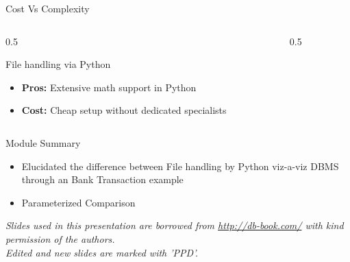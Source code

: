 \documentclass[aspectratio=169, xcolor=dvipsnames]{beamer}
\begin{document}
\begin{frame}{Cost Vs Complexity}
    \begin{columns}[t]
        \begin{column}{0.5\textwidth}
            \begin{alertblock}{File handling via Python}
                \begin{itemize}[<+->]
                    \item \textbf{Pros:} Extensive math support in Python
                    \item \textbf{Cost:} Cheap setup without dedicated specialists
                \end{itemize}
            \end{alertblock}
        \end{column}
        \begin{column}{0.5\textwidth}
        \end{column}
    \end{columns}
\end{frame}

\begin{frame}{Module Summary}
    \begin{itemize}
        \item Elucidated the difference between File handling by Python viz-a-viz DBMS through an Bank Transaction example
        \item Parameterized Comparison
    \end{itemize}
    
    \vspace{2em}
    \begin{center}
    \small \textit{Slides used in this presentation are borrowed from \url{http://db-book.com/} with kind permission of the authors.} \\
    \small \textit{Edited and new slides are marked with 'PPD'.}
    \end{center}
\end{frame}
\end{document}
